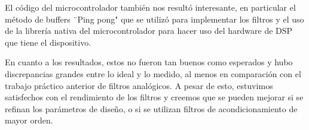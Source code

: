 \documentclass[11pt,a4paper]{report}
\begin{document}
El código del microcontrolador también nos resultó interesante, en particular el método de buffers ¨Ping pong" que se utilizó para implementar los filtros y el uso de la librería nativa del microcontrolador para hacer uso del hardware de DSP que tiene el dispositivo.


En cuanto a los resultados, estos no fueron tan buenos como esperados y hubo discrepancias grandes entre lo ideal y lo medido, al menos en comparación con el trabajo práctico anterior de filtros analógicos. A pesar de esto, estuvimos satisfechos con el rendimiento de los filtros y creemos que se pueden mejorar si se refinan los parámetros de diseño, o si se utilizan filtros de acondicionamiento de mayor orden. 


\printbibliography[title={Referencias}]
\end{document}
